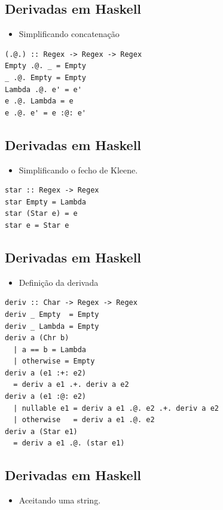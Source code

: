 \documentclass[11pt]{article}
\begin{document}
\subsection*{Derivadas em Haskell}
\label{sec:org24a3335}

\begin{itemize}
\item Simplificando concatenação
\end{itemize}

\begin{verbatim}
(.@.) :: Regex -> Regex -> Regex
Empty .@. _ = Empty
_ .@. Empty = Empty
Lambda .@. e' = e'
e .@. Lambda = e
e .@. e' = e :@: e'
\end{verbatim}
\subsection*{Derivadas em Haskell}
\label{sec:org3772494}

\begin{itemize}
\item Simplificando o fecho de Kleene.
\end{itemize}

\begin{verbatim}
star :: Regex -> Regex
star Empty = Lambda
star (Star e) = e
star e = Star e
\end{verbatim}
\subsection*{Derivadas em Haskell}
\label{sec:orgd731e90}

\begin{itemize}
\item Definição da derivada
\end{itemize}

\begin{verbatim}
deriv :: Char -> Regex -> Regex
deriv _ Empty  = Empty
deriv _ Lambda = Empty
deriv a (Chr b)
  | a == b = Lambda
  | otherwise = Empty
deriv a (e1 :+: e2)
  = deriv a e1 .+. deriv a e2
deriv a (e1 :@: e2)
  | nullable e1 = deriv a e1 .@. e2 .+. deriv a e2
  | otherwise   = deriv a e1 .@. e2
deriv a (Star e1)
  = deriv a e1 .@. (star e1)
\end{verbatim}
\subsection*{Derivadas em Haskell}
\label{sec:org26a6568}

\begin{itemize}
\item Aceitando uma string.
\end{itemize}
\end{document}
